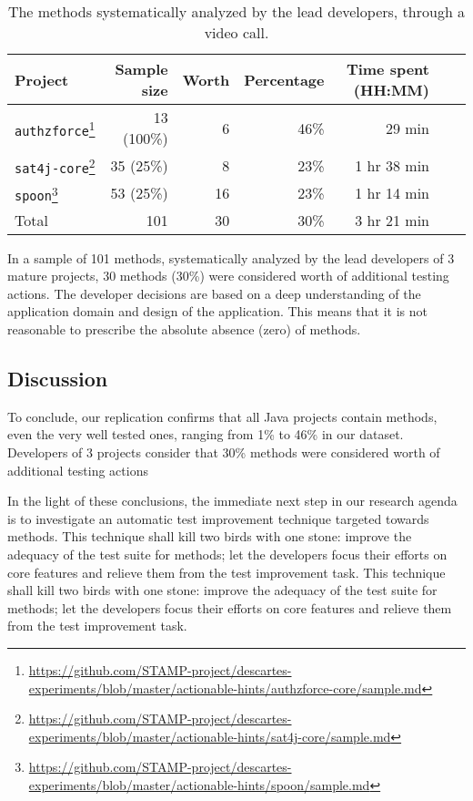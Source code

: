 \begin{table}
	\caption{The \pseudotested{} methods systematically analyzed by the lead developers, through a video call.}
	\label{tab:todevelopers}
	\centering
	\begin{tabular}{lrrrrrr}
		\toprule
		Project             & Sample size & Worth & Percentage  & Time spent (HH:MM)  \\
		\midrule
		\texttt{authzforce}\footnote{\url{https://github.com/STAMP-project/descartes-experiments/blob/master/actionable-hints/authzforce-core/sample.md}} &  13 (100\%) &                    6 &        46\% & 29 min              \\  
		\texttt{sat4j-core}\footnote{\url{https://github.com/STAMP-project/descartes-experiments/blob/master/actionable-hints/sat4j-core/sample.md}} &  35  (25\%) &                    8 &        23\% & 1 hr 38 min         \\
		\texttt{spoon}\footnote{\url{https://github.com/STAMP-project/descartes-experiments/blob/master/actionable-hints/spoon/sample.md}}      &  53  (25\%) &                   16 &        23\% & 1 hr 14 min         \\
		\midrule
		Total               & 101         &                   30 &        30\% & 3 hr 21 min         \\
		\bottomrule
	\end{tabular}
\end{table}

In a sample of 101 \pseudotested{} methods, systematically analyzed by the lead developers of 3 mature projects, 30 methods (30\%) were considered worth of additional testing actions. 
The developer decisions are based on a deep understanding of the application domain and design of the application. 
This means that it is not reasonable to prescribe the absolute absence (zero) of \pseudotested{} methods.

\subsection{Discussion}
\label{subsec:transversal-contributions:descartes:conclusion}

To conclude, our replication confirms that all Java projects contain \pseudotested{} methods, even the very well tested ones, ranging from 1\% to 46\% in our dataset.
Developers of 3 projects consider that 30\% methods were considered worth of additional testing actions

In the light of these conclusions, the immediate next step in our research agenda is to investigate an automatic test improvement technique targeted towards \pseudotested{} methods.
This technique shall kill two birds with one stone: improve the adequacy of the test suite for \pseudotested{} methods; 
let the developers focus their efforts on core features and relieve them from the test improvement task.
This technique shall kill two birds with one stone: improve the adequacy of the test suite for \pseudotested{} methods; let the developers focus their efforts on core features and relieve them from the test improvement task.

